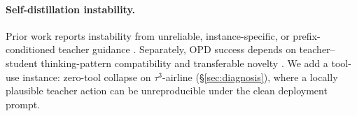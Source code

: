 \paragraph{Self-distillation instability.} Prior work reports instability from
unreliable, instance-specific, or prefix-conditioned teacher guidance
\citep{sdar2026,manyfaces2026,revisitopd2026}. Separately, OPD success depends
on teacher--student thinking-pattern compatibility and transferable novelty
\citep{thunlpopd2026}. We add a tool-use instance: zero-tool collapse on $\tau^3$-airline
(\S\ref{sec:diagnosis}), where a locally plausible teacher action can be
unreproducible under the clean deployment prompt.
